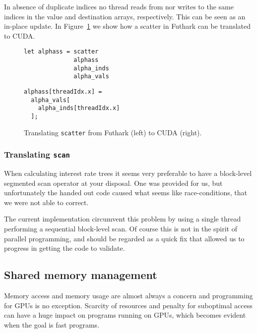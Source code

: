 In absence of duplicate indices no thread reads from nor
writes to the same indices in the value and destination
arrays, respectively. This can be seen as an in-place
update. In Figure~\ref{fig:trans_scatter} we show how a
scatter in Futhark can be translated to CUDA.
%
\begin{figure}[bt]
\begin{center}
\begin{minipage}[t]{0.45\linewidth}
\vspace{0pt}
\begin{lstlisting}
let alphass = scatter
              alphass
              alpha_inds
              alpha_vals
\end{lstlisting}
\end{minipage}
\begin{minipage}[t]{0.45\linewidth}
\vspace{0pt}
\begin{lstlisting}
alphass[threadIdx.x] =
  alpha_vals[
    alpha_inds[threadIdx.x]
  ];
\end{lstlisting}
\end{minipage}
\caption{Translating \texttt{scatter} from Futhark (left) to
  CUDA (right).}
\label{fig:trans_scatter}
\end{center}
\end{figure}


\subsubsection{Translating \texttt{scan}}

When calculating interest rate trees it seems very preferable to
have a block-level segmented scan operator at your disposal.
One was provided for us, but unfortunately the handed out code caused what
seems like race-conditions, that we were not able to correct.

The current implementation circumvent this problem by using
a single thread performing a sequential block-level scan.
Of course this is not in the spirit of parallel programming,
and should be regarded as a quick fix that allowed us to progress
in getting the code to validate.


\subsection{Shared memory management}

Memory access and memory usage are almost always a concern and
programming for GPUs is no exception. Scarcity of resources
and penalty for suboptimal access can have a huge impact on
programs running on GPUs, which becomes evident when the
goal is fast programs.


